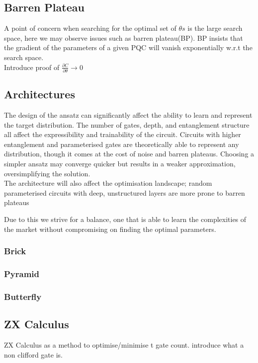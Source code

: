 \documentclass[12pt]{article}
\numberwithin{equation}{section}
\begin{document}
\subsection{Barren Plateau}
A point of concern when searching for the optimal set of $\theta s$ is the large 
search space, here we may observe issues such as barren plateau(BP). BP 
insists that the gradient of the parameters of a given PQC will vanish exponentially 
w.r.t the search space.
\\ 
Introduce proof of $\frac{\partial C}{\partial \theta} \rightarrow 0 $


\subsection{Architectures}
The design of the ansatz can significantly affect the ability to learn and represent 
the target distribution. The number of gates, depth, and entanglement structure
all affect the expressibility and trainability of the circuit. Circuits with 
higher entanglement and parameterised gates are theoretically able to represent 
any distribution, though it comes at the cost of noise and barren plateaus. 
Choosing a simpler ansatz may converge quicker but results in a weaker approximation,
oversimplifying the solution. 
\\
The architecture will also affect the optimisation landscape; random parameterised 
circuits with deep, unstructured layers are more prone to barren plateaus

Due to this we strive for a balance, one that is 
able to learn the complexities of the market without compromising on finding the 
optimal parameters. 
\subsubsection{Brick}
\subsubsection{Pyramid}
\subsubsection{Butterfly}




\subsection{ZX Calculus}
ZX Calculus as a method to optimise/minimise t gate count. introduce what a 
non clifford gate is.
\end{document}
